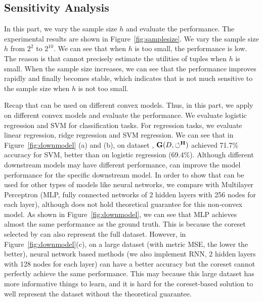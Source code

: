 \vspace{-0.5em}
\subsection{Sensitivity Analysis}
\label{exp:sec:sensitivity}


 In this part, we vary the sample size $h$ and evaluate the performance. The experimental results are shown in Figure~\ref{fig:samplesize}. We vary the sample size $h$ from $2^2$ to $2^{10}$. We can see that when $h$ is too small, the performance is low. The reason is that \ours cannot precisely estimate the utilities of tuples when $h$ is  small.  When the sample size increases, we can see that the performance improves rapidly and finally becomes stable, which indicates that \ours is not much sensitive to the sample size when $h$ is not too small.

 Recap that \ours can be used on different convex models. Thus, in this part, we apply \ours on different convex models and evaluate the performance. We evaluate logistic regression and SVM for classification tasks. For regression tasks, we evaluate linear regression, ridge regression and SVM regression. We can see that  in Figure~\ref{fig:downmodel} (a) and (b), on dataset \adult, $\mathbf{G}(D,\circlearrowleft^\mathbf{H})$ achieved 71.7\% accuracy for SVM, better than on logistic regression (69.4\%). Although different downstream models may have different performance, \ours can improve the model performance for the specific downstream model. In order to show that \ours can be used for other types of models like neural networks, we compare with Multilayer Perceptron (MLP, fully connected networks of 2 hidden layers with 256 nodes for each layer), although \ours does not hold
theoretical guarantee for this non-convex model. As shown in Figure~\ref{fig:downmodel}, we can see that MLP achieves almost the same performance as the ground truth. This is because the coreset selected by \ours can also represent the full dataset. However, in Figure~\ref{fig:downmodel}(c), on a large dataset \air (with metric MSE, the lower the better), neural network based methods (we also implement RNN, 2 hidden layers with 128 nodes for each layer) can have a better accuracy but the coreset cannot perfectly achieve the same performance. %
This may because this large dataset has more informative things to learn, and it is hard for the coreset-based solution to well represent the dataset without the theoretical guarantee.


